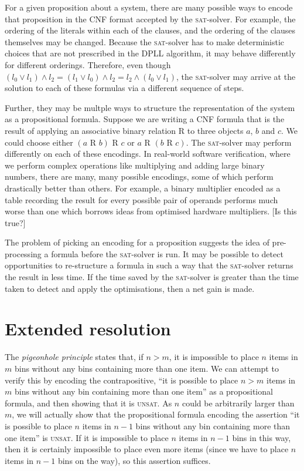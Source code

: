 \documentclass[pdftex,11pt,a4]{article}
\newcommand{\sat}{\textsc{sat}}
\newcommand{\unsat}{\textsc{unsat}}
\begin{document}
For a given proposition about a system, there are many possible ways to encode that proposition in the CNF format accepted by the \sat{}-solver. For example, the ordering of the literals within each of the clauses, and the ordering of the clauses themselves may be changed. Because the \sat{}-solver has to make deterministic choices that are not prescribed in the DPLL algorithm, it may behave differently for different orderings. Therefore, even though $(l_0 \vee l_1) \wedge l_2 = (l_1 \vee l_0) \wedge l_2 = l_2 \wedge (l_0 \vee l_1)$, the \sat{}-solver may arrive at the solution to each of these formulas via a different sequence of steps.

Further, they may be multple ways to structure the representation of the system as a propositional formula. Suppose we are writing a CNF formula that is the result of applying an associative binary relation R to three objects $a$, $b$ and $c$. We could choose either $(a\mbox{ R }b)\mbox{ R }c$ or $a\mbox{ R }(b\mbox{ R }c)$. The \sat{}-solver may perform differently on each of these encodings. In real-world software verification, where we perform complex operations like multiplying and adding large binary numbers, there are many, many possible encodings, some of which perform drastically better than others. For example, a binary multiplier encoded as a table recording the result for every possible pair of operands performs much worse than one which borrows ideas from optimised hardware multipliers. [Is this true?]

The problem of picking an encoding for a proposition suggests the idea of pre-processing a formula before the \sat{}-solver is run. It may be possible to detect opportunities to re-structure a formula in such a way that the \sat{}-solver returns the result in less time. If the time saved by the \sat{}-solver is greater than the time taken to detect and apply the optimisations, then a net gain is made.

\section{Extended resolution}

The \emph{pigeonhole principle} states that, if $n > m$, it is impossible to place $n$ items in $m$ bins without any bins containing more than one item. We can attempt to verify this by encoding the contrapositive, ``it is possible to place $n>m$ items in $m$ bins without any bin containing more than one item'' as a propositional formula, and then showing that it is \unsat. As $n$ could be arbitrarily larger than $m$, we will actually show that the propositional formula encoding the assertion ``it is possible to place $n$ items in $n-1$ bins without any bin containing more than one item'' is \unsat. If it is impossible to place $n$ items in $n-1$ bins in this way, then it is certainly impossible to place even more items (since we have to place $n$ items in $n-1$ bins on the way), so this assertion suffices.
\end{document}
